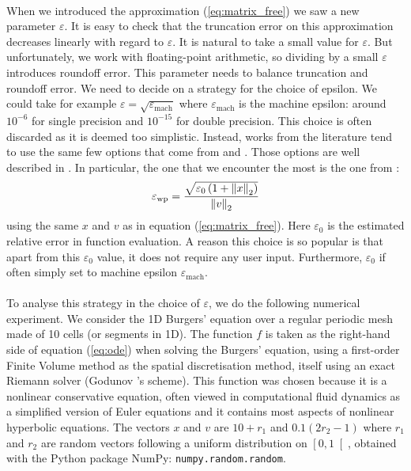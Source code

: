       \paragraph{}
      When we introduced the approximation (\ref{eq:matrix_free}) we saw a new parameter $\varepsilon$.
      It is easy to check that the truncation error on this approximation decreases linearly with regard to $\varepsilon$.
      It is natural to take a small value for $\varepsilon$.
      But unfortunately, we work with floating-point arithmetic, so dividing by a small $\varepsilon$ introduces roundoff error.
      This parameter needs to balance truncation and roundoff error.
      We need to decide on a strategy for the choice of epsilon.
      We could take for example $\varepsilon = \sqrt{\varepsilon_\textrm{mach}}$ where $\varepsilon_\textrm{mach}$ is the machine epsilon: around $10^{-6}$ for single precision and $10^{-15}$ for double precision.
      This choice is often discarded as it is deemed too simplistic.
      Instead, works from the literature tend to use the same few options \cite{ParkNourgalievMartineauEtAl2009, LiuZhangZhongEtAl2015, AbhyankarBrownConstantinescuEtAl2018} that come from \cite{PerniceWalker1998} and \cite{DennisSchnabel1996}.
      Those options are well described in \cite{KnollKeyes2004}.
      In particular, the one that we encounter the most is the one from \cite{PerniceWalker1998}:
      \begin{equation}\label{eq:epsilon_wp}
        \varepsilon_\textrm{wp} = \frac{\sqrt{\varepsilon_0 \left(1 + \norm[2]{x}\right) }}{\norm[2]{v}}
      \end{equation}
      using the same $x$ and $v$ as in equation (\ref{eq:matrix_free}).
      Here $\varepsilon_0$ is the estimated relative error in function evaluation.
      A reason this choice is so popular is that apart from this $\varepsilon_0$ value, it does not require any user input.
      Furthermore, $\varepsilon_0$ if often simply set to machine epsilon $\varepsilon_\textrm{mach}$.

      \paragraph{}
      To analyse this strategy in the choice of $\varepsilon$, we do the following numerical experiment.
      We consider the 1D Burgers' equation over a regular periodic mesh made of 10 cells (or segments in 1D).
      The function $f$ is taken as the right-hand side of equation (\ref{eq:ode}) when solving the Burgers' equation, using a first-order Finite Volume method as the spatial discretisation method, itself using an exact Riemann solver (Godunov 's scheme).
      This function was chosen because it is a nonlinear conservative equation, often viewed in computational fluid dynamics as a simplified version of Euler equations and it contains most aspects of nonlinear hyperbolic equations.
      The vectors $x$ and $v$ are $10 + r_1$ and $0.1 \left(2 r_2 - 1\right)$ where $r_1$ and $r_2$ are random vectors following a uniform distribution on $\left[0, 1\right[$, obtained with the Python package NumPy: \texttt{numpy.random.random}.

